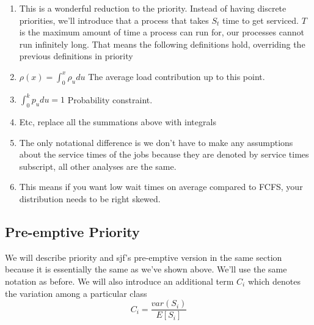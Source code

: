 \begin{enumerate}
\item This is a wonderful reduction to the priority.
  Instead of having discrete priorities, we'll introduce that a process that takes $S_t$ time to get serviced.
  $T$ is the maximum amount of time a process can run for, our processes cannot run infinitely long.
  That means the following definitions hold, overriding the previous definitions in priority
\item $\rho(x) = \int_0^x \rho_u du$ The average load contribution up to this point.
\item $\int_0^k p_u du = 1$ Probability constraint.
\item Etc, replace all the summations above with integrals
\item The only notational difference is we don't have to make any assumptions about the service times of the jobs because they are denoted by service times subscript, all other analyses are the same.
  \item This means if you want low wait times on average compared to FCFS, your distribution needs to be right skewed.
\end{enumerate}

\subsection{Pre-emptive Priority}

We will describe priority and sjf's pre-emptive version in the same section because it is essentially the same as we've shown above.
We'll use the same notation as before.
We will also introduce an additional term $C_i$ which denotes the variation among a particular class
\[
    C_i = \frac{var(S_i)}{E[S_i]}
\]

